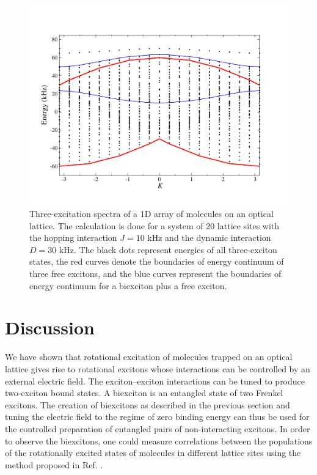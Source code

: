  

\begin{figure}[htbp]
\centering
\includegraphics[width=\linewidth]{threeExcitons.pdf}
\caption{Three-excitation spectra of a 1D array of molecules on an optical lattice. The calculation is done for a
 system of 20 lattice sites with the hopping interaction $J =10$ kHz and the dynamic interaction $D =30$ kHz.
The black dots represent energies of all three-exciton states, the red curves denote the boundaries of  energy
 continuum of three free excitons, and the blue curves represent the boundaries of energy continuum for a biexciton 
plus a free exciton. 
   }
\label{fig:trimer}
\end{figure}


\section{Discussion} 
We have shown that rotational excitation of molecules trapped on an optical lattice gives rise to rotational excitons
 whose interactions can be controlled by an external electric field. The exciton--exciton interactions can be tuned to
 produce two-exciton bound states.  A biexciton is an entangled state of two Frenkel excitons. The creation of
 biexcitons as described in the previous section and tuning the electric field to the regime of zero binding energy can
 thus be used for the controlled preparation of entangled pairs of non-interacting excitons. In order to observe the
 biexcitons, one could measure correlations between the populations of the rotationally excited states of molecules in
 different lattice sites using the method proposed in Ref. \cite{demille}. 




